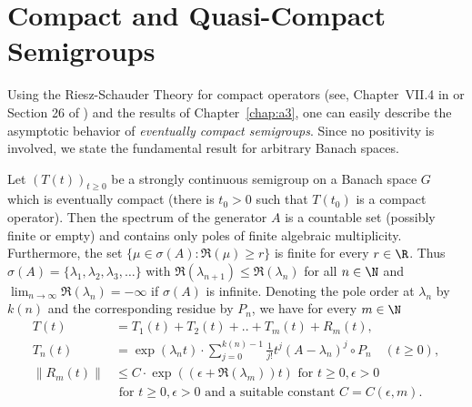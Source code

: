 \section{Compact and Quasi-Compact Semigroups}\label{sec:b4-2}
\hspace{1cm}{\Large by Günther Greiner}
\vspace{.5cm}
\newline
Using the Riesz-Schauder Theory for compact operators (see, \eg
Chapter~VII.4 in \textcite{dunfordschwartz:1958} or Section 26 of \textcite{pietsch:1978}) and the results of Chapter~\ref{chap:a3},  one can easily describe the
asymptotic behavior of \emph{eventually compact semigroups}.
Since no positivity is involved, we state the fundamental result for arbitrary Banach
spaces.
\begin{theorem}\label{thm:b4-2.1}
Let $(T(t))_{t \geq 0}$ be a strongly continuous semigroup on a Banach space $G$ which is eventually compact (\ie  there is $t_{0} > 0$ such that $T(t_{0})$ is a compact operator).
Then the spectrum of the generator $A$ is a countable set (possibly finite or empty) and contains only poles of finite algebraic multiplicity.
Furthermore, the set $\{\mu \in \sigma(A) \colon \Re(\mu) \geq r\}$ is finite for every $r \in \R$.
Thus
	$\sigma(A) = \{\lambda_1,\lambda_2,\lambda_3, \ldots \}$ with $\Re(\lambda_{n+1}) \leq \Re(\lambda_n)$ for all $n \in \N$ and
	$\lim_{n \to \infty} \Re(\lambda_n) = -\infty$ if\/ $\sigma(A)$ is infinite.
	Denoting the pole order at $\lambda_n$ by $k(n)$ and the corresponding residue
	by $P_n$, we have for every $m \in \N$
\begin{equation}\label{eq:b4-2.1}
\begin{aligned}
	T(t) &= T_1(t) + T_2(t) + .. + T_m(t) + R_m(t) ,\\
	T_n(t) &= \exp(\lambda_n t) \cdot \sum_{j=0}^{k(n)-1} \frac{1}{j!}t^j(A - \lambda_n)^j \circ P_n 
		\quad (t \geq 0) ,\\
	\|R_m(t)\| & \leq C \cdot \exp((\epsilon +\Re(\lambda_m))t) \text{ for }  t \geq 0, \epsilon >0\\
			&  \text{ for }  t \geq 0, \epsilon >0  \text{ and a suitable	constant } C=C(\epsilon ,m) .
		\end{aligned}
	\end{equation}
\end{theorem}
